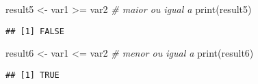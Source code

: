 \documentclass[
]{article}
\newenvironment{Shaded}{\begin{snugshade}}{\end{snugshade}}
\newcommand{\CommentTok}[1]{\textcolor[rgb]{0.56,0.35,0.01}{\textit{#1}}}
\newcommand{\FunctionTok}[1]{\textcolor[rgb]{0.00,0.00,0.00}{#1}}
\newcommand{\NormalTok}[1]{#1}
\newcommand{\OtherTok}[1]{\textcolor[rgb]{0.56,0.35,0.01}{#1}}
\newcommand{\SpecialCharTok}[1]{\textcolor[rgb]{0.00,0.00,0.00}{#1}}
\begin{document}
\begin{Shaded}
\begin{Highlighting}[]
\NormalTok{result5 }\OtherTok{\textless{}{-}}\NormalTok{ var1 }\SpecialCharTok{\textgreater{}=}\NormalTok{ var2 }\CommentTok{\# maior ou igual a}
\FunctionTok{print}\NormalTok{(result5)}
\end{Highlighting}
\end{Shaded}

\begin{verbatim}
## [1] FALSE
\end{verbatim}

\begin{Shaded}
\begin{Highlighting}[]
\NormalTok{result6 }\OtherTok{\textless{}{-}}\NormalTok{ var1 }\SpecialCharTok{\textless{}=}\NormalTok{ var2 }\CommentTok{\# menor ou igual a}
\FunctionTok{print}\NormalTok{(result6)}
\end{Highlighting}
\end{Shaded}

\begin{verbatim}
## [1] TRUE
\end{verbatim}
\end{document}
